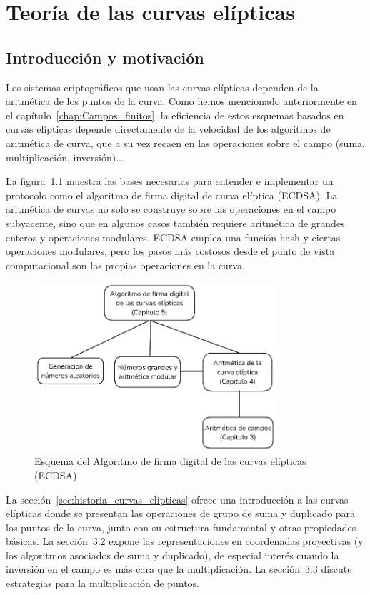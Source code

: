 \chapter{Teoría de las curvas elípticas}

\section{Introducción y motivación}
Los sistemas criptográficos que usan las curvas elípticas dependen de la aritmética de los puntos de la curva. Como hemos mencionado anteriormente en el capítulo~\ref{chap:Campos_finitos}, la eficiencia de estos esquemas basados en curvas elípticas depende directamente de la velocidad de los algoritmos de aritmética de curva, que a su vez recaen en las operaciones sobre el campo (suma, multiplicación, inversión)...

La figura~\ref{fig:ECDSA_esquema} muestra las bases necesarias para entender e implementar un protocolo como el algoritmo de firma digital de curva elíptica (ECDSA). La aritmética de curvas no solo se construye sobre las operaciones en el campo subyacente, sino que en algunos casos también requiere aritmética de grandes enteros y operaciones modulares. ECDSA emplea una función hash y ciertas operaciones modulares, pero los pasos más costosos desde el punto de vista computacional son las propias operaciones en la curva.
\begin{figure}[H]
    \centering
    \includegraphics[width=0.8\textwidth]{imagenes/ECDSA_esquema.png}
    \caption{Esquema del Algoritmo de firma digital de las curvas elípticas (ECDSA)}
    \label{fig:ECDSA_esquema}
\end{figure}
La sección~\ref{sec:historia_curvas_elipticas} ofrece una introducción a las curvas elípticas donde se presentan las operaciones de grupo de suma y duplicado para los puntos de la curva, junto con su estructura fundamental y otras propiedades básicas. La sección~3.2 expone las representaciones en coordenadas proyectivas (y los algoritmos asociados de suma y duplicado), de especial interés cuando la inversión en el campo es más cara que la multiplicación. La sección~3.3 discute estrategias para la multiplicación de puntos.

